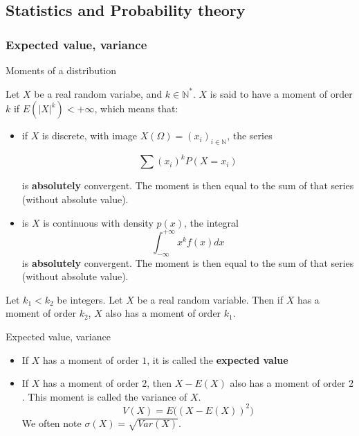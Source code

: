 \documentclass[
10pt, %
a4paper, %
oneside, %
headinclude,footinclude, %
BCOR5mm, %
]{scrartcl}
\begin{document}
\subsection{\large\color{MidnightBlue}Statistics and Probability theory}

\subsubsection{\large\color{Periwinkle}Expected value, variance}

\begin{definition}{Moments of a distribution}

    Let $X$ be a real random variabe, and $k\in \mathbb{N}^*$. $X$ is said to have a moment of order $k$ if $E(|X|^k)<+\infty$, which means that:
    \begin{itemize}
	\item if $X$ is discrete, with image $X(\Omega)=(x_i)_{i\in \mathbb{N} }$, the series

	    \begin{equation*}
		\sum (x_i)^kP(X=x_i)
	    \end{equation*}

	    is \textbf{{absolutely}}  convergent. The moment is then equal to the sum of that series (without absolute value).
	\item is $X$ is continuous with density $p(x)$, the integral
	    \begin{equation*}
	        \int^{+\infty}_{-\infty} x^kf(x)  dx 
	    \end{equation*}
	    is \textbf{{absolutely}}  convergent. The moment is then equal to the sum of that series (without absolute value).
    \end{itemize}
\end{definition}

\begin{proposition}

    Let $k_1<k_2$ be integers. Let $X$ be a real random variable. Then if $X$ has a moment of order $k_2$, $X$ also has a moment of order $k_1$.
    
\end{proposition}

\begin{definition}{Expected value, variance}

    \begin{itemize}
        \item If $X$ has a moment of order $1$, it is called the \textbf{{expected value}} 
	\item If $X$ has a moment of order $2$, then $X-E(X)$ also has a moment of order $2$. This moment is called the variance of $X$.
	    \begin{equation}
		V(X)=E\big((X-E(X))^2\big)
	    \end{equation}
	    We often note $\sigma(X)= \sqrt{Var(X)}$. 
    \end{itemize}

\end{definition}
\end{document}
